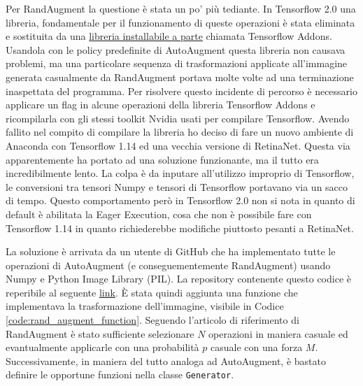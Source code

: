 Per RandAugment la questione è stata un po' più tediante. In Tensorflow 2.0 una libreria, fondamentale per il funzionamento di queste operazioni è stata eliminata e sostituita da una \href{https://github.com/tensorflow/addons}{libreria installabile a parte} chiamata Tensorflow Addons. 
Usandola con le policy predefinite di AutoAugment questa libreria non causava problemi, ma una particolare sequenza di trasformazioni applicate all'immagine generata casualmente da RandAugment portava molte volte ad una terminazione inaspettata del programma. Per risolvere questo incidente di percorso è necessario applicare un flag in alcune operazioni della libreria Tensorflow Addons e ricompilarla con gli stessi toolkit Nvidia usati per compilare Tensorflow. Avendo fallito nel compito di compilare la libreria ho deciso di fare un nuovo ambiente di Anaconda con Tensorflow 1.14 ed una vecchia versione di RetinaNet. 
Questa via apparentemente ha portato ad una soluzione funzionante, ma il tutto era incredibilmente lento. La colpa è da inputare all'utilizzo improprio di Tensorflow, le conversioni tra tensori Numpy e tensori di Tensorflow portavano via un sacco di tempo. Questo comportamento però in Tensorflow 2.0 non si nota in quanto di default è abilitata la Eager Execution, cosa che non è possibile fare con Tensorflow 1.14 in quanto richiederebbe modifiche piuttosto pesanti a RetinaNet.  

La soluzione è arrivata da un utente di GitHub che ha implementato tutte le operazioni di AutoAugment (e conseguementemente RandAugment) usando Numpy e Python Image Library (PIL). La repository contenente questo codice è reperibile al seguente \href{https://github.com/poodarchu/learn_aug_for_object_detection.numpy}{link}.
È stata quindi aggiunta una funzione che implementava la trasformazione dell'immagine, visibile in Codice \ref{code:rand_augment_function}. Seguendo l'articolo di riferimento di RandAugment è stato sufficiente selezionare $N$ operazioni in maniera casuale ed evantualmente applicarle con una probabilità $p$ casuale con una forza $M$.
Successivamente, in maniera del tutto analoga ad AutoAugment, è bastato definire le opportune funzioni nella classe \texttt{Generator}. 

